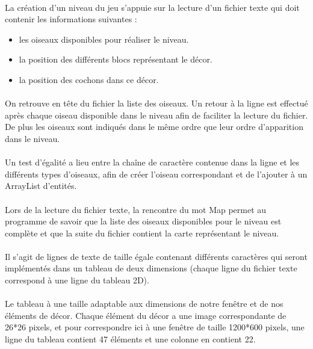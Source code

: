 \documentclass[a4paper,12pt]{report}
\begin{document}
\paragraph{}La création d’un niveau du jeu s’appuie sur la lecture d’un fichier texte qui doit contenir les informations suivantes :
\begin{itemize}
\item les oiseaux disponibles pour réaliser le niveau.
\item la position des différents blocs représentant le décor.
\item la position des cochons dans ce décor.
\end{itemize}

\paragraph{}On retrouve en tête du fichier la liste des oiseaux. Un retour à la ligne est effectué après chaque oiseau disponible dans le niveau afin de faciliter la lecture du fichier. De plus les oiseaux sont indiqués dans le même ordre que leur ordre d’apparition dans le niveau.
\paragraph{}Un test d’égalité a lieu entre la chaîne de caractère contenue dans la ligne et les différents types d’oiseaux, afin de créer l’oiseau correspondant et de l’ajouter à un ArrayList d’entités.
\paragraph{}Lors de la lecture du fichier texte, la rencontre du mot \guillemotleft Map \guillemotright permet au programme de savoir que la liste des oiseaux disponibles pour le niveau est complète et que la suite du fichier contient la carte représentant le niveau.
\paragraph{}Il s’agit de lignes de texte de taille égale contenant différents caractères qui seront implémentés dans un tableau de deux dimensions (chaque ligne du fichier texte correspond à une ligne du tableau 2D).
\paragraph{}Le tableau à une taille adaptable aux dimensions de notre fenêtre et de nos éléments de décor. Chaque élément du décor a une image correspondante de 26*26 pixels, et pour correspondre ici à une fenêtre de taille 1200*600 pixels, une ligne du tableau contient 47 éléments et une colonne en contient 22.
\end{document}
